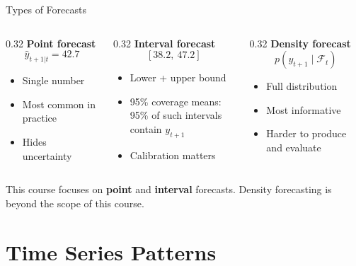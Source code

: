 \documentclass[aspectratio=169, 11pt]{beamer}
\begin{document}
\begin{frame}{Types of Forecasts}
  \begin{columns}[T]
    \begin{column}{0.32\textwidth}
      \textbf{Point forecast}
      \[
        \hat{y}_{t+1|t} = 42.7
      \]
      \begin{itemize}
        \item Single number
        \item Most common in practice
        \item Hides uncertainty
      \end{itemize}
    \end{column}
    \begin{column}{0.32\textwidth}
      \textbf{Interval forecast}
      \[
        [38.2,\ 47.2]
      \]
      \begin{itemize}
        \item Lower + upper bound
        \item 95\% coverage means:\\
              95\% of such intervals contain $y_{t+1}$
        \item Calibration matters
      \end{itemize}
    \end{column}
    \begin{column}{0.32\textwidth}
      \textbf{Density forecast}
      \[
        p(y_{t+1} \mid \mathcal{F}_t)
      \]
      \begin{itemize}
        \item Full distribution
        \item Most informative
        \item Harder to produce and evaluate
      \end{itemize}
    \end{column}
  \end{columns}
  \vspace{0.4cm}
  \begin{keybox}
    This course focuses on \textbf{point} and \textbf{interval} forecasts.
    Density forecasting is beyond the scope of this course.
  \end{keybox}
\end{frame}

\section{Time Series Patterns}
\end{document}

